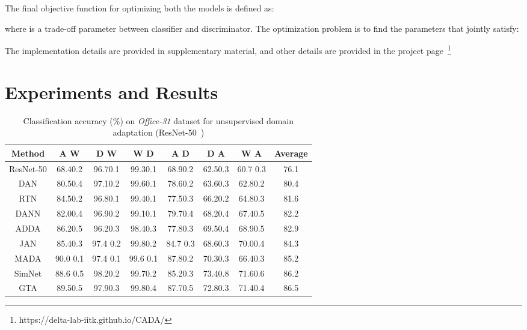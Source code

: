 \documentclass[10pt,twocolumn,letterpaper]{article}
\begin{document}
The final objective function  for optimizing both the models is defined as:

where  is a trade-off parameter between classifier and discriminator. The optimization problem is to find the parameters  that jointly satisfy: 

\vspace{-0.3cm}

The implementation details are provided in supplementary material, and other details are provided in the project page~\footnote{https://delta-lab-iitk.github.io/CADA/}
\section{Experiments and Results}
\begin{table*}[!]
\centering
\caption {Classification accuracy (\%) on \textit{Office-31} dataset for unsupervised domain adaptation (ResNet-50~\cite{he2016deep})} 
\begin{tabular}{cccccccc}
 \toprule
  \textbf{Method }& A  W & D W &  W  D &A  D & D  A & W  A & Average \\ 
  \midrule
 ResNet-50\cite{he2016deep} &   68.40.2   &    96.70.1  &    99.30.1    &    68.90.2   &    62.50.3  &    60.7 0.3 &   76.1\\
DAN\cite{long_ICML2015} &   80.50.4   &    97.10.2   &    99.60.1    &    78.60.2    &    63.60.3   &    62.80.2  &   80.4\\
 RTN\cite{long_NIPS2016} &   84.50.2   &    96.80.1  &    99.40.1    &    77.50.3    &    66.20.2   &    64.80.3  &   81.6\\
 DANN\cite{ganin_ICML2015} &   82.00.4   &    96.90.2   &    99.10.1    &    79.70.4    &    68.20.4   &    67.40.5  &  82.2 \\
 ADDA \cite{tzeng_CVPR2017}&   86.20.5   &    96.20.3   &    98.40.3    &    77.80.3    &    69.50.4   &    68.90.5  &  82.9 \\
 JAN\cite{long_ICML2017} &   85.40.3   &    97.4 0.2  &    99.80.2    &    84.7 0.3   &    68.60.3   &    70.00.4  &  84.3 \\
 MADA\cite{pei_arxiv2018} &  90.0 0.1  &   97.4 0.1   &    99.6 0.1   &   87.80.2    &    70.30.3   &    66.40.3  &  85.2 \\
 SimNet\cite{pinheiro_cvpr2017unsupervised} & 88.6 0.5  &  98.20.2   &    99.70.2    &    85.20.3    &   73.40.8  &   71.60.6 &  86.2 \\
 GTA\cite{sankaranarayanan_cvpr2018learning} &   89.50.5   &    97.90.3   &    99.80.4    &   87.70.5    &    72.80.3   &    71.40.4  &  86.5 \\

\end{tabular}
\end{table*}
\end{document}
